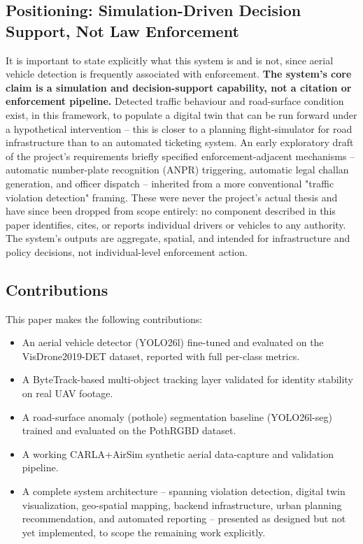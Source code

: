 \documentclass[conference]{IEEEtran}
\begin{document}
\subsection{Positioning: Simulation-Driven Decision Support, Not Law Enforcement}

It is important to state explicitly what this system is and is not, since aerial vehicle detection is frequently associated with enforcement. \textbf{The system's core claim is a simulation and decision-support capability, not a citation or enforcement pipeline.} Detected traffic behaviour and road-surface condition exist, in this framework, to populate a digital twin that can be run forward under a hypothetical intervention -- this is closer to a planning flight-simulator for road infrastructure than to an automated ticketing system. An early exploratory draft of the project's requirements briefly specified enforcement-adjacent mechanisms -- automatic number-plate recognition (ANPR) triggering, automatic legal challan generation, and officer dispatch -- inherited from a more conventional "traffic violation detection" framing. These were never the project's actual thesis and have since been dropped from scope entirely: no component described in this paper identifies, cites, or reports individual drivers or vehicles to any authority. The system's outputs are aggregate, spatial, and intended for infrastructure and policy decisions, not individual-level enforcement action.

\subsection{Contributions}

This paper makes the following contributions:
\begin{itemize}
    \item An aerial vehicle detector (YOLO26l) fine-tuned and evaluated on the VisDrone2019-DET dataset, reported with full per-class metrics.
    \item A ByteTrack-based multi-object tracking layer validated for identity stability on real UAV footage.
    \item A road-surface anomaly (pothole) segmentation baseline (YOLO26l-seg) trained and evaluated on the PothRGBD dataset.
    \item A working CARLA+AirSim synthetic aerial data-capture and validation pipeline.
    \item A complete system architecture -- spanning violation detection, digital twin visualization, geo-spatial mapping, backend infrastructure, urban planning recommendation, and automated reporting -- presented as designed but not yet implemented, to scope the remaining work explicitly.
\end{itemize}
\end{document}
